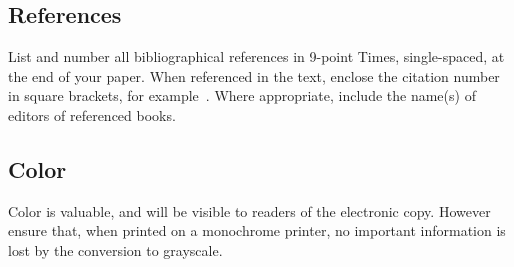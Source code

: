 \documentclass{bmvc2k}
\begin{document}
\subsection{References}

List and number all bibliographical references in 9-point Times,
single-spaced, at the end of your paper. When referenced in the text,
enclose the citation number in square brackets, for
example~\cite{Authors06}.  Where appropriate, include the name(s) of
editors of referenced books.


\subsection{Color}

Color is valuable, and will be visible to readers of the electronic copy.
However ensure that, when printed on a monochrome printer, no important
information is lost by the conversion to grayscale.


\end{document}
